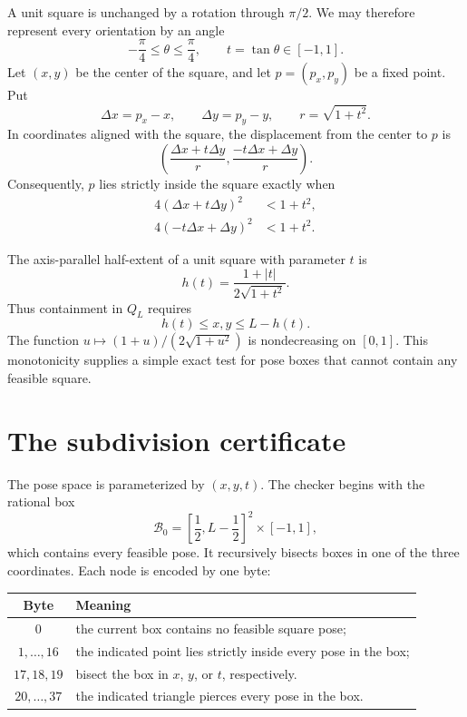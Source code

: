 \documentclass[11pt]{article}
\theoremstyle{definition}
\theoremstyle{remark}
\newcommand{\Q}{Q}
\newcommand{\abs}[1]{\left|#1\right|}
\begin{document}
A unit square is unchanged by a rotation through $\pi/2$.  We may therefore
represent every orientation by an angle
\[
  -\frac{\pi}{4}\le \theta\le\frac{\pi}{4},
  \qquad t=\tan\theta\in[-1,1].
\]
Let $(x,y)$ be the center of the square, and let $p=(p_x,p_y)$ be a fixed
point.  Put
\[
  \Delta x=p_x-x,\qquad \Delta y=p_y-y,
  \qquad r=\sqrt{1+t^2}.
\]
In coordinates aligned with the square, the displacement from the center to
$p$ is
\[
  \left(\frac{\Delta x+t\Delta y}{r},
        \frac{-t\Delta x+\Delta y}{r}\right).
\]
Consequently, $p$ lies strictly inside the square exactly when
\begin{align}
  4(\Delta x+t\Delta y)^2 &< 1+t^2,\label{eq:inside-a}\\
  4(-t\Delta x+\Delta y)^2 &< 1+t^2.\label{eq:inside-b}
\end{align}

The axis-parallel half-extent of a unit square with parameter $t$ is
\[
  h(t)=\frac{1+\abs{t}}{2\sqrt{1+t^2}}.
\]
Thus containment in $\Q_L$ requires
\[
  h(t)\le x,y\le L-h(t).
\]
The function $u\mapsto(1+u)/(2\sqrt{1+u^2})$ is nondecreasing on $[0,1]$.
This monotonicity supplies a simple exact test for pose boxes that cannot
contain any feasible square.

\section{The subdivision certificate}\label{sec:certificate}

The pose space is parameterized by $(x,y,t)$.  The checker begins with the
rational box
\[
  \mathcal B_0=
  \left[\frac12,L-\frac12\right]^2\times[-1,1],
\]
which contains every feasible pose.  It recursively bisects boxes in one of
the three coordinates.  Each node is encoded by one byte:

\begin{center}
\begin{tabular}{cl}
\toprule
Byte & Meaning\\
\midrule
$0$ & the current box contains no feasible square pose;\\
$1,\dots,16$ & the indicated point lies strictly inside every pose in the box;\\
$17,18,19$ & bisect the box in $x$, $y$, or $t$, respectively.\\
$20,\dots,37$ & the indicated triangle pierces every pose in the box.\\
\bottomrule
\end{tabular}
\end{center}
\end{document}

